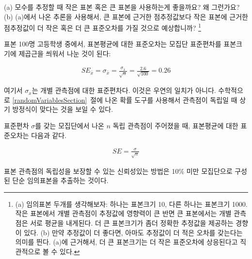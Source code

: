 \textC{\newpage}

\begin{exercise}
(a) 모수를 추정할 때 작은 표본 혹은 큰 표본을 사용하는게 좋을까요? 왜 그런가요? (b) (a)에서 나온 추론을 사용해서, 큰 표본에 근거한 점추정값보다 작은 표본에 근거한 점추정값이 더 작은 혹은 더 큰 표준오차를 가질 것으로 예상합니까?
\footnote{(a) 임의표본 두개를 생각해보자: 하나는 표본크기 10, 다른 하나는 표본크기 1000. 작은 표본에서 개별 관측점이 추정값에 영향력이 큰 반면 큰 표본에서는 개별 관측점은 서로 평균을 내게된다. 더 큰 표본크기가 좀더 정확한 추정값을 제공하는 경향이 있다. (b) 만약 추정값이 더 좋다면, 아마도 추정값이 더 적은 오차를 갖는다는 의미를 띈다. (a)에 근거해서, 더 큰 표본크기는 더 작은 표준오차에 상응된다고 직관적으로 볼 수 있다.}
\end{exercise}

표본 100명 고등학생 중에서, 표본평균에 대한 표준오차는 모집단 표준편차를 표본크기에 제곱근을 씌워서 나눈 것이 된다:

\begin{eqnarray*}
SE_{\bar{x}} = \sigma_{\bar{x}} = \frac{\sigma_{x}}{\sqrt{n}} = \frac{2.6}{\sqrt{100}} = 0.26
\end{eqnarray*}

여기서 $\sigma_{x}$는 개별 관측점에 대한 표준편차다. 이것은 우연의 일치가 아니다. 수학적으로 \ref{randomVariablesSection}~절에 나온 확률 도구를 사용해서 관측점이 독립일 때 상기 방정식이 맞다는 것을 보일 수 있다.

\begin{termBox}{
표준편차 $\sigma$를 갖는 모집단에서 나온 $n$ 독립 관측점이 주어졌을 때, 표본평균에 대한 표준오차는 다음과 같다.\vspace{-1mm}

\begin{eqnarray}
SE = \frac{\sigma}{\sqrt{n}}
\label{seOfXBar}
\end{eqnarray}\vspace{-3mm}%

표본 관측점의 독립성을 보장할 수 있는 신뢰성있는 방법은 10\% 미만 모집단으로 구성된 단순 임의표본을 추출하는 것이다.
}
\end{termBox}

